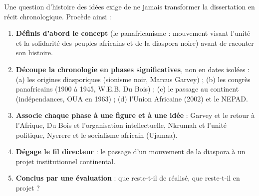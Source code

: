 \documentclass[11pt]{article}
\begin{document}
\begin{methode}
Une question d'histoire des idées exige de ne jamais transformer la dissertation en récit chronologique. Procède ainsi :
\begin{enumerate}
\item \textbf{Définis d'abord le concept} (le panafricanisme : mouvement visant l'unité et la solidarité des peuples africains et de la diaspora noire) avant de raconter son histoire.
\item \textbf{Découpe la chronologie en phases significatives}, non en dates isolées : (a) les origines diasporiques (sionisme noir, Marcus Garvey) ; (b) les congrès panafricains (1900 à 1945, W.E.B. Du Bois) ; (c) le passage au continent (indépendances, OUA en 1963) ; (d) l'Union Africaine (2002) et le NEPAD.
\item \textbf{Associe chaque phase à une figure et à une idée} : Garvey et le retour à l'Afrique, Du Bois et l'organisation intellectuelle, Nkrumah et l'unité politique, Nyerere et le socialisme africain (Ujamaa).
\item \textbf{Dégage le fil directeur} : le passage d'un mouvement de la diaspora à un projet institutionnel continental.
\item \textbf{Conclus par une évaluation} : que reste-t-il de réalisé, que reste-t-il en projet ?
\end{enumerate}
\end{methode}
\end{document}
